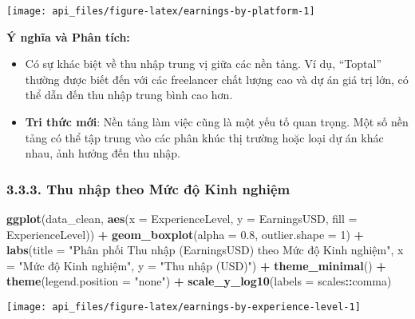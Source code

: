 \documentclass[
]{article}
\newenvironment{Shaded}{\begin{snugshade}}{\end{snugshade}}
\newcommand{\AttributeTok}[1]{\textcolor[rgb]{0.13,0.29,0.53}{#1}}
\newcommand{\DecValTok}[1]{\textcolor[rgb]{0.00,0.00,0.81}{#1}}
\newcommand{\FloatTok}[1]{\textcolor[rgb]{0.00,0.00,0.81}{#1}}
\newcommand{\FunctionTok}[1]{\textcolor[rgb]{0.13,0.29,0.53}{\textbf{#1}}}
\newcommand{\NormalTok}[1]{#1}
\newcommand{\SpecialCharTok}[1]{\textcolor[rgb]{0.81,0.36,0.00}{\textbf{#1}}}
\newcommand{\StringTok}[1]{\textcolor[rgb]{0.31,0.60,0.02}{#1}}
\begin{document}
\begin{center}\texttt{[image: api\_files/figure-latex/earnings-by-platform-1]} \end{center}

\textbf{Ý nghĩa và Phân tích:}

\begin{itemize}
\item
  Có sự khác biệt về thu nhập trung vị giữa các nền tảng. Ví dụ,
  ``Toptal'' thường được biết đến với các freelancer chất lượng cao và
  dự án giá trị lớn, có thể dẫn đến thu nhập trung bình cao hơn.
\item
  \textbf{Tri thức mới}: Nền tảng làm việc cũng là một yếu tố quan
  trọng. Một số nền tảng có thể tập trung vào các phân khúc thị trường
  hoặc loại dự án khác nhau, ảnh hưởng đến thu nhập.
\end{itemize}

\subsubsection{3.3.3. Thu nhập theo Mức độ Kinh
nghiệm}\label{thu-nhux1eadp-theo-mux1ee9c-ux111ux1ed9-kinh-nghiux1ec7m}

\begin{Shaded}
\begin{Highlighting}[]
\FunctionTok{ggplot}\NormalTok{(data\_clean, }\FunctionTok{aes}\NormalTok{(}\AttributeTok{x =}\NormalTok{ ExperienceLevel, }\AttributeTok{y =}\NormalTok{ EarningsUSD, }\AttributeTok{fill =}\NormalTok{ ExperienceLevel)) }\SpecialCharTok{+}
  \FunctionTok{geom\_boxplot}\NormalTok{(}\AttributeTok{alpha =} \FloatTok{0.8}\NormalTok{, }\AttributeTok{outlier.shape =} \DecValTok{1}\NormalTok{) }\SpecialCharTok{+}
  \FunctionTok{labs}\NormalTok{(}\AttributeTok{title =} \StringTok{"Phân phối Thu nhập (EarningsUSD) theo Mức độ Kinh nghiệm"}\NormalTok{,}
       \AttributeTok{x =} \StringTok{"Mức độ Kinh nghiệm"}\NormalTok{,}
       \AttributeTok{y =} \StringTok{"Thu nhập (USD)"}\NormalTok{) }\SpecialCharTok{+}
  \FunctionTok{theme\_minimal}\NormalTok{() }\SpecialCharTok{+}
  \FunctionTok{theme}\NormalTok{(}\AttributeTok{legend.position =} \StringTok{"none"}\NormalTok{) }\SpecialCharTok{+}
  \FunctionTok{scale\_y\_log10}\NormalTok{(}\AttributeTok{labels =}\NormalTok{ scales}\SpecialCharTok{::}\NormalTok{comma) }
\end{Highlighting}
\end{Shaded}

\begin{center}\texttt{[image: api\_files/figure-latex/earnings-by-experience-level-1]} \end{center}
\end{document}

